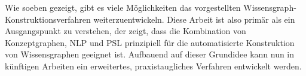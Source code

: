 Wie soeben gezeigt, gibt es viele Möglichkeiten das vorgestellten Wissensgraph-Konstruktionsverfahren weiterzuentwickeln.
Diese Arbeit ist also primär als ein Ausgangspunkt zu verstehen, der zeigt, dass die Kombination von Konzeptgraphen, NLP und PSL prinzipiell für die automatisierte Konstruktion von Wissensgraphen geeignet ist.
Aufbauend auf dieser Grundidee kann nun in künftigen Arbeiten ein erweitertes, praxistaugliches Verfahren entwickelt werden.
